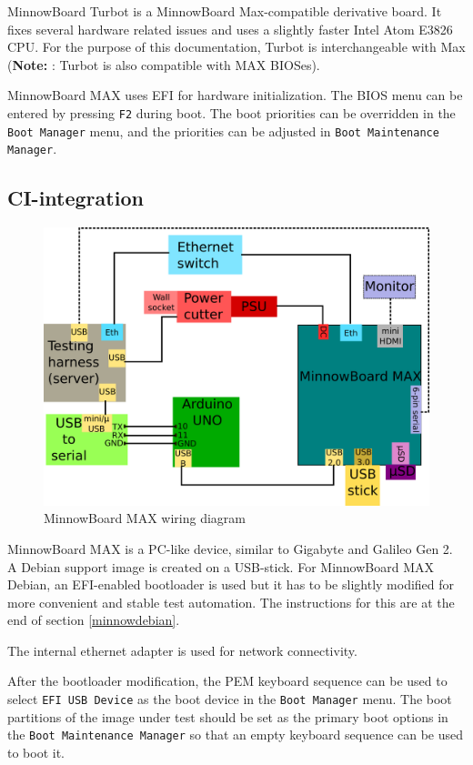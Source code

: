 \documentclass[a4paper,11pt]{article}
\newcommand{\note}{\textbf{Note: }}
\newcommand{\cmd}[1]{\texttt{#1}}
\begin{document}
MinnowBoard Turbot is a MinnowBoard Max-compatible derivative board. It fixes several hardware related issues and uses a slightly faster Intel Atom E3826 CPU. For the purpose of this documentation, Turbot is interchangeable with Max (\note: Turbot is also compatible with MAX BIOSes).

MinnowBoard MAX uses EFI for hardware initialization. The BIOS menu can be entered by pressing \cmd{F2} during boot. The boot priorities can be overridden in the \cmd{Boot Manager} menu, and the priorities can be adjusted in \cmd{Boot Maintenance Manager}.

\subsection{CI-integration}

\begin{figure}[h]
	\centering
	\includegraphics[width=0.7\linewidth]{minnowwiring.png}
	\caption{MinnowBoard MAX wiring diagram}
	\label{fig:minnowwiring}
\end{figure}

MinnowBoard MAX is a PC-like device, similar to Gigabyte and Galileo Gen 2. A Debian support image is created on a USB-stick. For MinnowBoard MAX Debian, an EFI-enabled bootloader is used but it has to be slightly modified for more convenient and stable test automation. The instructions for this are at the end of section \ref{minnowdebian}.

The internal ethernet adapter is used for network connectivity.

After the bootloader modification, the PEM keyboard sequence can be used to select \cmd{EFI USB Device} as the boot device in the \cmd{Boot Manager} menu. The boot partitions of the image under test should be set as the primary boot options in the \cmd{Boot Maintenance Manager} so that an empty keyboard sequence can be used to boot it.
\end{document}
